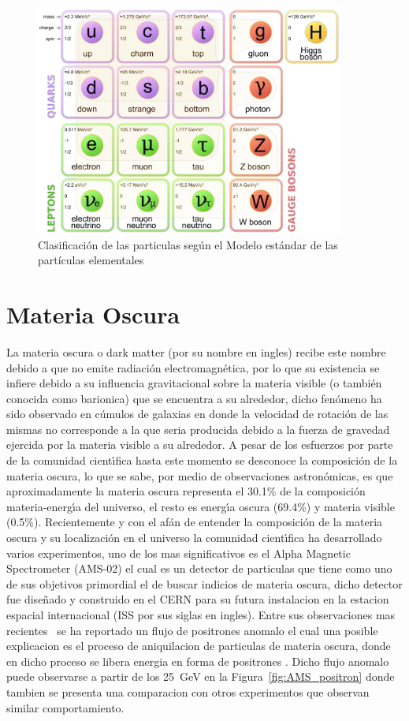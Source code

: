 \begin{figure}
\begin{center}
  \includegraphics[width=4.0in]{standard-model.png}
  \caption{Clasificaci\'on de las particulas seg\'un el Modelo est\'andar de las part\'iculas elementales}
  \label{fig:ME}
\end{center}
\end{figure}


\section{Materia Oscura}

La materia oscura o dark matter (por su nombre en ingles) recibe este nombre debido a que no emite radiaci\'on electromagn\'etica, por lo que su existencia se infiere debido a su influencia gravitacional sobre la materia visible (o tambi\'en conocida como barionica) que se encuentra a su alrededor, dicho fen\'omeno ha sido observado en c\'umulos de galaxias en donde la velocidad de rotaci\'on de las mismas no corresponde a la que seria producida debido a la fuerza de gravedad ejercida por la materia visible a su alrededor. A pesar de los esfuerzos por parte de la comunidad cient\'{\i}fica hasta este momento se desconoce la composici\'on de la materia oscura, lo que se sabe, por medio de observaciones astron\'omicas, es que aproximadamente la materia oscura representa el 30.1\%  de la composici\'on materia-energ\'{\i}a del universo, el resto es energ\'{\i}a oscura (69.4\%) y materia visible (0.5\%). Recientemente y con el af\'an de entender la composici\'on de la materia oscura y su localizaci\'on en el universo la comunidad cient\'{\i}fica ha desarrollado varios experimentos, uno de los mas significativos es el Alpha Magnetic Spectrometer (AMS-02) el cual es un detector de particulas que tiene como uno de sus objetivos primordial el de buscar indicios de materia oscura, dicho detector fue dise\~nado y construido en el CERN para su futura instalacion en la estacion espacial internacional (ISS por sus siglas en ingles). Entre sus observaciones mas recientes~\cite{ams:cern} se ha reportado un flujo de positrones anomalo el cual una posible explicacion es el proceso de aniquilacion de particulas de materia oscura, donde en dicho proceso se libera energia en forma de positrones .  Dicho flujo anomalo puede observarse a partir de los 25~GeV en la Figura~\ref{fig:AMS_positron} donde tambien se presenta una comparacion con otros experimentos que observan similar comportamiento.

